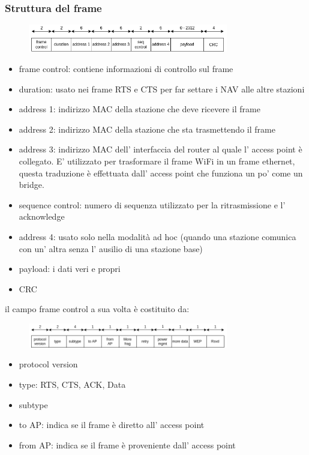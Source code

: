 \subsubsection{Struttura del frame}
\begin{figure}[H]
    \centering
    \includegraphics[width=330px]{images/8_Wireless_Mobile/802.11_frame.png}
\end{figure}
\begin{itemize}
    \item frame control: contiene informazioni di controllo sul frame
    \item duration: usato nei frame RTS e CTS per far settare i NAV alle altre stazioni
    \item address 1: indirizzo MAC della stazione che deve ricevere il frame
    \item address 2: indirizzo MAC della stazione che sta trasmettendo il frame
    \item address 3: indirizzo MAC dell' interfaccia del router al quale l' access point è collegato.
    E' utilizzato per trasformare il frame WiFi in un frame ethernet, questa traduzione è effettuata dall' access point che funziona un po' come un bridge.
    
    \item sequence control: numero di sequenza utilizzato per la ritrasmissione e l' acknowledge
    \item address 4: usato solo nella modalità ad hoc (quando una stazione comunica con un' altra senza l' ausilio di una stazione base)
    \item payload: i dati veri e propri
    \item CRC
\end{itemize}
il campo frame control a sua volta è costituito da:
\begin{figure}[H]
    \centering
    \includegraphics[width=330px]{images/8_Wireless_Mobile/802.11_frame_control.png}
\end{figure}
\begin{itemize}
    \item protocol version
    \item type: RTS, CTS, ACK, Data
    \item subtype
    \item to AP: indica se il frame è diretto all' access point
    \item from AP: indica se il frame è proveniente dall' access point
\end{itemize}

